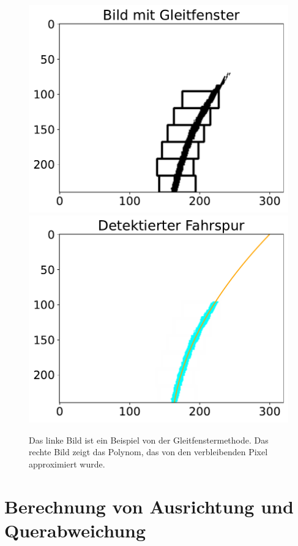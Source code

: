 \documentclass[arbeit=studie,oneside,BCOR=12mm]{ArbeitRST}
\begin{document}
\begin{figure}[h]
    \centering
    \includegraphics[scale=0.47]{before_filter}
    \includegraphics[scale=0.47]{after_filter}
    \caption{Das linke Bild ist ein Beispiel von der Gleitfenstermethode. Das rechte Bild
    zeigt das Polynom, das von den verbleibenden Pixel approximiert wurde.}
    \label{gleit}
\end{figure}

\section{Berechnung von Ausrichtung und Querabweichung}
\end{document}

